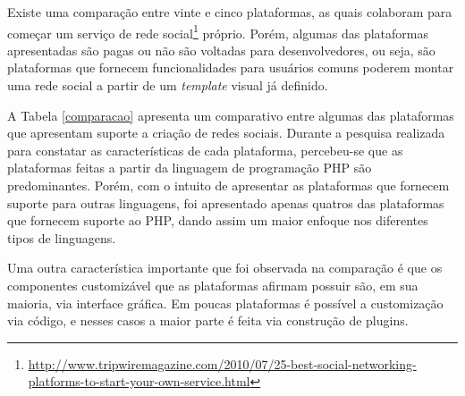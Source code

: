 Existe uma comparação entre vinte e cinco plataformas, as quais colaboram para começar um serviço de rede social\footnote{\url{http://www.tripwiremagazine.com/2010/07/25-best-social-networking-platforms-to-start-your-own-service.html}}  próprio. Porém, algumas das plataformas apresentadas são pagas ou não são voltadas para desenvolvedores, ou seja, são plataformas que fornecem funcionalidades para usuários comuns poderem montar uma rede social a partir de um \textit{template} visual já definido.

A Tabela \ref{comparacao} apresenta um comparativo entre algumas das plataformas que apresentam suporte a criação de redes sociais. Durante a pesquisa realizada para constatar as características de cada plataforma, percebeu-se que as plataformas feitas a partir da linguagem de programação PHP são predominantes. Porém, com o intuito de apresentar as plataformas que fornecem suporte para outras linguagens, foi apresentado apenas quatros das plataformas que fornecem suporte ao PHP, dando assim um maior enfoque nos diferentes tipos de linguagens.

Uma outra característica importante que foi observada na comparação é que os componentes customizável que as plataformas afirmam possuir são, em sua maioria, via interface gráfica. Em poucas plataformas é possível a customização via código, e nesses casos a maior parte é feita via construção de plugins.

\newpage

